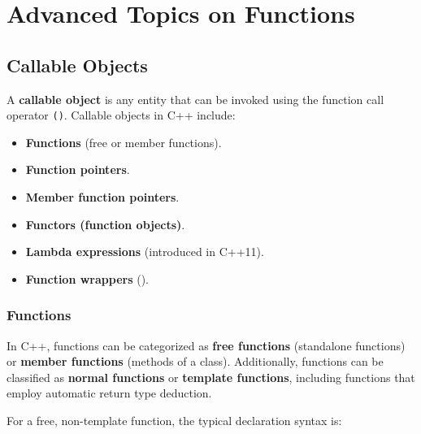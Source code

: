 \chapter{Advanced Topics on Functions}

\vspace{-1em}

\section{Callable Objects}

\vspace{-0.5em}

A \textbf{callable object} is any entity that can be invoked using the function call operator \texttt{()}. Callable objects in C++ include:

\vspace{-0.7em}

\begin{multicols}{2}
\begin{itemize}
    \item \textbf{Functions} (free or member functions).
    \item \textbf{Function pointers}.
    \item \textbf{Member function pointers}.
    \item \textbf{Functors (function objects)}.
    \item \textbf{Lambda expressions} (introduced in C++11).
    \item \textbf{Function wrappers} ().
\end{itemize}
\end{multicols}

\vspace{-1.5em}

\subsection{Functions}

In C++, functions can be categorized as \textbf{free functions} (standalone functions) or \textbf{member functions} (methods of a class). Additionally, functions can be classified as \textbf{normal functions} or \textbf{template functions}, including functions that employ automatic return type deduction.

For a free, non-template function, the typical declaration syntax is:

\vspace{-0.5em}

